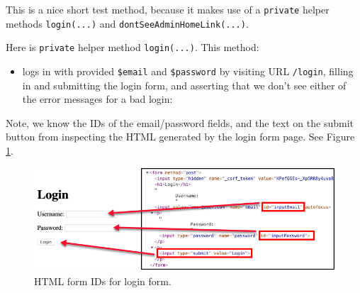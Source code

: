 \documentclass[a4paperpaper,openright]{book}
\newenvironment{Shaded}{}{}
\newcommand{\CommentTok}[1]{\textcolor[rgb]{0.38,0.63,0.69}{\textit{#1}}}
\newcommand{\KeywordTok}[1]{\textcolor[rgb]{0.00,0.44,0.13}{\textbf{#1}}}
\newcommand{\NormalTok}[1]{#1}
\newcommand{\OtherTok}[1]{\textcolor[rgb]{0.00,0.44,0.13}{#1}}
\newcommand{\StringTok}[1]{\textcolor[rgb]{0.25,0.44,0.63}{#1}}
\providecommand{\tightlist}{%
  \setlength{\itemsep}{0pt}\setlength{\parskip}{0pt}}
\begin{document}
This is a nice short test method, because it makes use of a
\texttt{private} helper methods \texttt{login(...)} and
\texttt{dontSeeAdminHomeLink(...)}.

Here is \texttt{private} helper method \texttt{login(...)}. This method:

\begin{itemize}
\tightlist
\item
  logs in with provided \texttt{\$email} and \texttt{\$password} by
  visiting URL \texttt{/login}, filling in and submitting the login
  form, and asserting that we don't see either of the error messages for
  a bad login:
\end{itemize}

\begin{Shaded}
\end{Shaded}

Note, we know the IDs of the email/password fields, and the text on the
submit button from inspecting the HTML generated by the login form page.
See Figure \ref{loginIds}.

\begin{figure}
\centering
\includegraphics{./tex2pdf.-d01fd108a306454d/995637c50831a7ce3f68e1aa8c8a4db770df590e.png}
\caption{HTML form IDs for login form.\label{loginIds}}
\end{figure}
\end{document}
